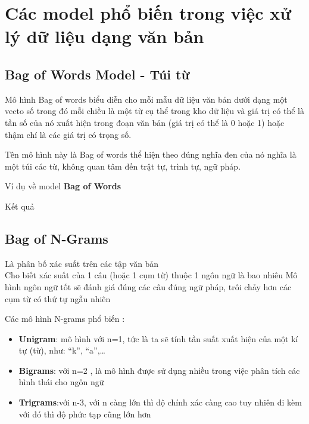 \section{Các model phổ biến trong việc xử lý dữ liệu dạng văn bản}

\subsection{Bag of Words Model - Túi từ}
Mô hình Bag of words biểu diễn cho mỗi mẫu dữ liệu văn bản dưới dạng một vecto số trong đó mỗi chiều là một từ cụ thể trong kho dữ liệu và giá trị có thể là tần số của nó xuất hiện trong đoạn văn bản (giá trị có thể là 0 hoặc 1) hoặc thậm chí là các giá trị có trọng số. \cite{WEBSITE:10}

Tên mô hình này là Bag of words thể hiện theo đúng nghĩa đen của nó nghĩa là một túi các từ, không quan tâm đến trật tự, trình tự, ngữ pháp. \cite{WEBSITE:10}

Ví dụ về model \textbf{Bag of Words}



Kết quả


\subsection{Bag of N-Grams}
Là phân bố xác suất trên các tập văn bản\\

Cho biết xác suất của 1 câu (hoặc 1 cụm từ) thuộc 1 ngôn ngữ là bao nhiêu
Mô hình ngôn ngữ tốt sẽ đánh giá đúng các câu đúng ngữ pháp, trôi chảy hơn các cụm từ có thứ tự ngẫu nhiên \cite{NGRAM1}

Các mô hình N-grams phổ biến \cite{NGRAM}:
\begin{itemize}
	\item \textbf{Unigram}: mô hình với n=1, tức là ta sẽ tính tần suất xuất hiện của một kí tự (từ), như: “k”, “a”,…
	\item \textbf{Bigrams}: với n=2 , là mô hình được sử dụng nhiều trong việc phân tích các hình thái cho ngôn ngữ
	\item \textbf{Trigrams}:với n-3, với n càng lớn thì độ chính xác càng cao tuy nhiên đi kèm với đó thì độ phức tạp cũng lớn hơn
\end{itemize}

